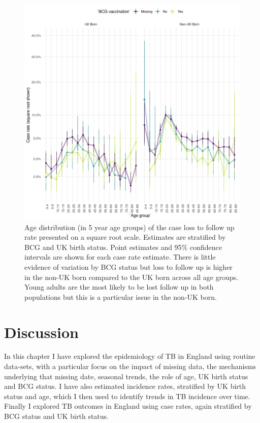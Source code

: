 \documentclass[11pt,twoside]{bristolthesis}
\begin{document}
  \begin{figure}
  
  {\centering \includegraphics[width=0.8\linewidth]{chapters/tb-epi-england/figures/plot-loss-fol-age-dist} 
  
  }
  
  \caption{Age distribution (in 5 year age groups) of the case loss to follow up rate presented on a square root scale. Estimates are stratified by BCG and UK birth status. Point estimates and 95\%  confidence intervals are shown for each case rate estimate. There is little evidence of variation by BCG status but loss to follow up is higher in the non-UK born compared to the UK born across all age groups. Young adults are the most likely to be lost follow up in both populations but this is a particular issue in the non-UK born.}\label{fig:plot-loss-fol-age-dist}
  \end{figure}
  \hypertarget{discussion}{%
  \section{Discussion}\label{discussion}}
  
  In this chapter I have explored the epidemiology of TB in England using routine data-sets, with a particular focus on the impact of missing data, the mechanisms underlying that missing date, seasonal trends, the role of age, UK birth status and BCG status. I have also estimated incidence rates, stratified by UK birth status and age, which I then used to identify trends in TB incidence over time. Finally I explored TB outcomes in England using case rates, again stratified by BCG status and UK birth status.
  
\end{document}
